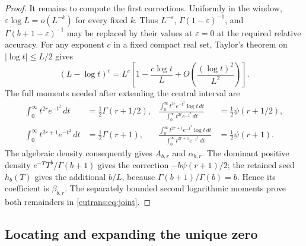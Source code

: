 \documentclass[11pt,a4paper]{article}
\numberwithin{equation}{section}
\theoremstyle{definition}
\theoremstyle{remark}
\begin{document}
\begin{proof}
It remains to compute the first corrections. Uniformly in the window,
$\varepsilon\log L=o(L^{-k})$ for every fixed $k$.
Thus $L^{-\varepsilon}$, $\Gamma(1-\varepsilon)^{-1}$, and
$\Gamma(b+1-\varepsilon)^{-1}$ may be replaced by their values at
$\varepsilon=0$ at the required relative accuracy. For any exponent
$c$ in a fixed compact real set, Taylor's theorem on
$|\log t|\leq L/2$ gives
\[
 (L-\log t)^c=L^c\left[
         1-\frac{c\log t}{L}
          +O\left(\frac{(\log t)^2}{L^2}\right)\right].
\]
The full moments needed after extending the central interval are
\begin{align*}
 \int_0^\infty t^{2r}e^{-t^2}\,dt&=\frac12\Gamma(r+1/2),
 &\frac{\int_0^\infty t^{2r}e^{-t^2}\log t\,dt}
       {\int_0^\infty t^{2r}e^{-t^2}\,dt}
       &=\frac12\psi(r+1/2),\\
 \int_0^\infty t^{2r+1}e^{-t^2}\,dt&=\frac12\Gamma(r+1),
 &\frac{\int_0^\infty t^{2r+1}e^{-t^2}\log t\,dt}
       {\int_0^\infty t^{2r+1}e^{-t^2}\,dt}
       &=\frac12\psi(r+1).
\end{align*}
The algebraic density consequently gives $A_{b,r}$ and
$\alpha_{b,r}$. The dominant positive density
$e^{-T}T^b/\Gamma(b+1)$ gives the correction
$-b\psi(r+1)/2$; the retained seed $h_b(T)$ gives the additional
$b/L$, because $\Gamma(b+1)/\Gamma(b)=b$. Hence its coefficient is
$\beta_{b,r}$. The separately bounded second logarithmic moments
prove both remainders in \eqref{eutrans:eq:joint}.
\end{proof}

\subsection{Locating and expanding the unique zero}
\end{document}
